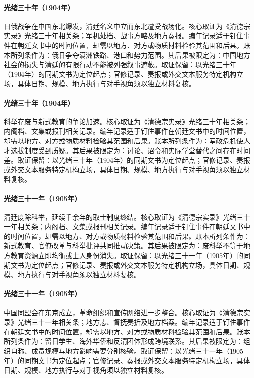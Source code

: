 \hypertarget{ledger:EQ-1904-RUSSO-JAPANESE-WAR}{}\paragraph{光绪三十年（1904年）}日俄战争在中国东北爆发，清廷名义中立而东北遭受战场化。核心取证为《清德宗实录》光绪三十年相关条；军机处档、战事方略及地方奏报。编年记录适于钉住事件在朝廷文书中的时间位置，却需以地方、对方或物质材料检验其范围和后果。账本所列条件为：俄日争夺满洲铁路、港口和势力范围。其后果被限定为：中国地方社会的损失与清廷的有限行动不能被列强叙事遮蔽。取证保留：以光绪三十年（1904年）的同期文书为定位起点；官修记录、奏报或外交文本服务特定机构立场，具体日期、规模、地方执行与对手视角须以独立材料复核。
\hypertarget{ledger:EQ-1904-IMPERIAL-EXAMINATION-DEBATE}{}\paragraph{光绪三十年（1904年）}科举存废与新式教育的争论加速。核心取证为《清德宗实录》光绪三十年相关条；内阁档、文集或报刊相关记录。编年记录适于钉住事件在朝廷文书中的时间位置，却需以地方、对方或物质材料检验其范围和后果。账本所列条件为：军政危机使人才选拔制度受到质疑。其后果被限定为：讨论、诏令和实际学堂替代之间存在时间差。取证保留：以光绪三十年（1904年）的同期文书为定位起点；官修记录、奏报或外交文本服务特定机构立场，具体日期、规模、地方执行与对手视角须以独立材料复核。
\hypertarget{ledger:EQ-1905-ABOLITION-OF-CIVIL-SERVICE-EXAM}{}\paragraph{光绪三十一年（1905年）}清廷废除科举，延续千余年的取士制度终结。核心取证为《清德宗实录》光绪三十一年相关条；内阁档、文集或报刊相关记录。编年记录适于钉住事件在朝廷文书中的时间位置，却需以地方、对方或物质材料检验其范围和后果。账本所列条件为：新式教育、官僚改革与科举批评共同推动决策。其后果被限定为：废科举不等于地方教育资源立即均衡或士人身份消失。取证保留：以光绪三十一年（1905年）的同期文书为定位起点；官修记录、奏报或外交文本服务特定机构立场，具体日期、规模、地方执行与对手视角须以独立材料复核。
\hypertarget{ledger:EQ-1905-TONGMENGHUI}{}\paragraph{光绪三十一年（1905年）}中国同盟会在东京成立，革命组织和宣传网络进一步整合。核心取证为《清德宗实录》光绪三十一年相关条；地方志、督抚奏折及地方档案。编年记录适于钉住事件在朝廷文书中的时间位置，却需以地方、对方或物质材料检验其范围和后果。账本所列条件为：留日学生、海外华侨和反清团体形成跨境联系。其后果被限定为：组织自称、成员规模与地方影响需要分别核验。取证保留：以光绪三十一年（1905年）的同期文书为定位起点；官修记录、奏报或外交文本服务特定机构立场，具体日期、规模、地方执行与对手视角须以独立材料复核。
